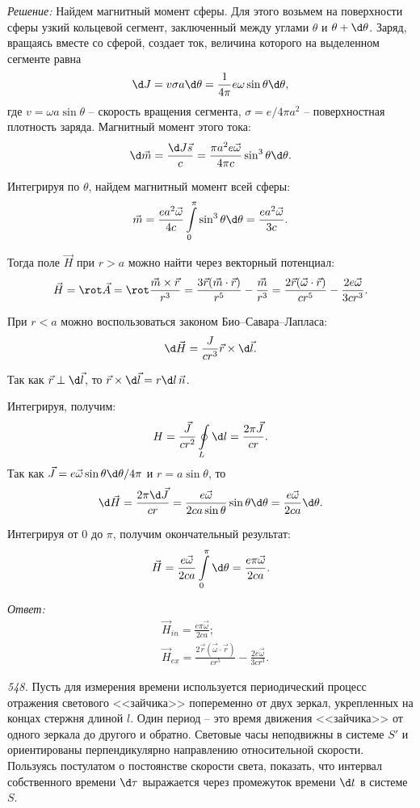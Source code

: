 \vspace*{2em}
\emph{Решение:}
Найдем магнитный момент сферы. Для этого возьмем на поверхности сферы узкий
кольцевой сегмент, заключенный между углами \( \theta \) и \( \theta + \d\theta \).
Заряд, вращаясь вместе со сферой, создает ток, величина которого на выделенном
сегменте равна
\[
    \d J = v\sigma a\d\theta = \frac{1}{4\pi}e\omega\sin\theta\d\theta,
\]
где \( v = \omega a\sin\theta \) -- скорость вращения сегмента, \( \sigma =
e/4\pi a^2 \) -- поверхностная плотность заряда. Магнитный момент этого тока:
\[
    \d\vec{m} = \frac{\d J\vec{s}}{c} = \frac{\pi a^2e\vec{\omega}}{4\pi c}
    \sin^3\theta\d\theta.
\]

Интегрируя по \( \theta \), найдем магнитный момент всей сферы:
\[
    \vec{m} =  \frac{ea^2\vec{\omega}}{4c}\int\limits_0^\pi \sin^3\theta\d\theta
    = \frac{ea^2\vec{\omega}}{3c}.
\]

Тогда поле \( \vec{H} \) при \( r > a \) можно найти через векторный потенциал:
\[
    \vec{H} = \rot\vec{A} = \rot\frac{\vec{m}\times\vec{r}}{r^3} =
    \frac{3\vec{r}(\vec{m}\cdot\vec{r})}{r^5} - \frac{\vec{m}}{r^3} =
    \frac{2\vec{r}(\vec{\omega}\cdot\vec{r})}{cr^5} - \frac{2e\vec{\omega}}{3cr^3}.
\]

При \( r < a \) можно воспользоваться законом Био--Савара--Лапласа:
\[
    \d\vec{H} = \frac{J}{cr^3}\vec{r}\times\d\vec{l}.
\]

Так как \( \vec{r} \perp \d\vec{l} \), то \( \vec{r}\times\d\vec{l} = r\d l\,\vec{n} \).

Интегрируя, получим:
\[
    H = \frac{\vec{J}}{cr^2}\oint\limits_L \d l = \frac{2\pi\vec{J}}{cr}.
\]
Так как \( \vec{J} = e\vec{\omega}\sin\theta\d\theta/4\pi \) и \( r = a\sin\theta \), то
\[
    \d\vec{H} = \frac{2\pi\d\vec{J}}{cr} = \frac{e\vec{\omega}}{2ca\sin\theta}
    \sin\theta\d\theta = \frac{e\vec{\omega}}{2ca}\d\theta.
\]

Интегрируя от \( 0 \) до \( \pi \), получим окончательный результат:
\[
    \vec{H} = \frac{e\vec{\omega}}{2ca}\int\limits_0^\pi \d\theta =
    \frac{e\pi\vec{\omega}}{2ca}.
\]

\vspace*{2em}
\emph{Ответ:}
\begin{align*}
    & \vec{H}_{in} = \frac{e\pi\vec{\omega}}{2ca}; \\
    & \vec{H}_{ex} = \frac{2\vec{r}(\vec{\omega}\cdot\vec{r})}{cr^5} -
    \frac{2e\vec{\omega}}{3cr^3}.
\end{align*}

\newpage
\emph{548.} Пусть для измерения времени используется периодический процесс
отражения светового <<зайчика>> попеременно от двух зеркал, укрепленных на
концах стержня длиной \( l \). Один период -- это время движения <<зайчика>> от
одного зеркала до другого и обратно. Световые часы неподвижны в системе \( S' \)
и ориентированы перпендикулярно направлению относительной скорости.
Пользуясь постулатом о постоянстве скорости света, показать, что интервал
собственного времени \( \d\tau \) выражается через промежуток времени \( \d t \)
в системе \( S \).


